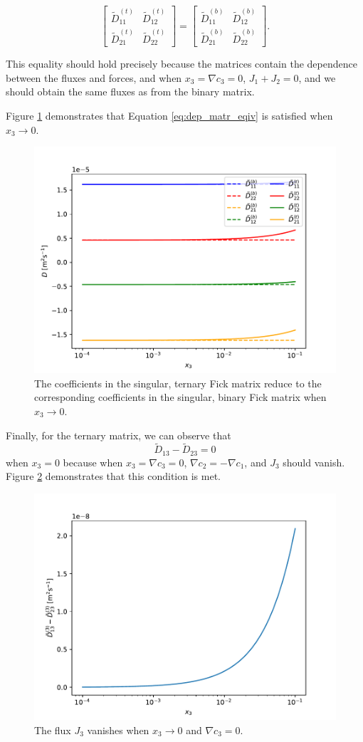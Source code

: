 \begin{equation}
    \begin{bmatrix}\tilde{D}_{11}^{(t)} & \tilde{D}_{12}^{(t)} \\ \tilde{D}_{21}^{(t)} & \tilde{D}_{22}^{(t)} \end{bmatrix} = \begin{bmatrix}\tilde{D}_{11}^{(b)} & \tilde{D}_{12}^{(b)} \\ \tilde{D}_{21}^{(b)} & \tilde{D}_{22}^{(b)}\end{bmatrix}.
    \label{eq:dep_matr_eqiv}
\end{equation}

This equality should hold precisely because the matrices contain the dependence between the fluxes and forces, and when $x_3 = \nabla c_3 = 0$, $J_1 + J_2 = 0$, and we should obtain the same fluxes as from the binary matrix.

Figure \ref{fig:dependent} demonstrates that Equation \eqref{eq:dep_matr_eqiv} is satisfied when $x_3 \to 0$.

\begin{figure}[bht]
    \centering
    \includegraphics[width=.75\textwidth]{dependent.pdf}
    \caption{The coefficients in the singular, ternary Fick matrix reduce to the corresponding coefficients in the singular, binary Fick matrix when $x_3 \to 0$.}
    \label{fig:dependent}
\end{figure}

Finally, for the ternary matrix, we can observe that
\begin{equation}
    \tilde{D}_{13} - \tilde{D}_{23} = 0
\end{equation}
when $x_3 = 0$ because when $x_3 = \nabla c_3 = 0$, $\nabla c_2 = - \nabla c_1$, and $J_3$ should vanish. Figure \ref{fig:vanish3} demonstrates that this condition is met.

\begin{figure}[bth]
    \centering
    \includegraphics[width=.75\textwidth]{vanish3.pdf}
    \caption{The flux $J_3$ vanishes when $x_3 \to 0$ and $\nabla c_3 = 0$.}
    \label{fig:vanish3}
\end{figure}
